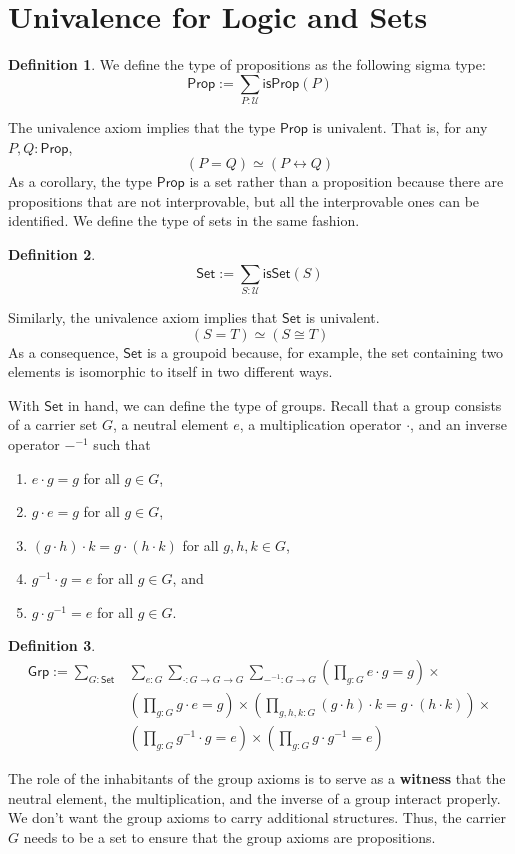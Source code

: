 \documentclass{amsart}
\theoremstyle{definition}
\newtheorem{defn}{Definition}[section]
\newcommand{\Prop}{\ensuremath{\mathsf{Prop}}}
\newcommand{\isProp}{\ensuremath{\mathsf{isProp}}}
\newcommand{\Set}{\ensuremath{\mathsf{Set}}}
\newcommand{\isSet}{\ensuremath{\mathsf{isSet}}}
\newcommand{\Grp}{\ensuremath{\mathsf{Grp}}}
\newcommand{\U}{\ensuremath{\mathcal{U}}}
\renewcommand{\emph}{\textbf}
\begin{document}
\section{Univalence for Logic and Sets}
\begin{defn}
    We define the type of propositions as the following sigma type:
    \[\Prop := \sum_{P : \U} \isProp(P)\]
\end{defn}
The univalence axiom implies that the type $\Prop$ is univalent.
That is, for any $P, Q : \Prop$,
\[
    (P = Q) \simeq (P \leftrightarrow Q)
\]
As a corollary, the type $\Prop$ is a set rather than a proposition because there are propositions that are not interprovable, but all the interprovable ones can be identified.
We define the type of sets in the same fashion.
\begin{defn}
\[
    \Set := \sum_{S : \U} \isSet(S)
\]
\end{defn}
Similarly, the univalence axiom implies that $\Set$ is univalent.
\[
    (S = T) \simeq (S \cong T)
\]
As a consequence, $\Set$ is a groupoid because, for example, the set containing two elements is isomorphic to itself in two different ways.

With $\Set$ in hand, we can define the type of groups.
Recall that a group consists of a carrier set $G$, a neutral element $e$, a multiplication operator $\cdot$, and an inverse operator $-^{-1}$ such that
\begin{enumerate}
    \item $e \cdot g = g$ for all $g \in G$,
    \item $g \cdot e = g$ for all $g \in G$,
    \item $(g \cdot h) \cdot k = g \cdot (h \cdot k)$ for all $g, h, k \in G$,
    \item $g^{-1} \cdot g = e$ for all $g \in G$, and
    \item $g \cdot g^{-1} = e$ for all $g \in G$.
\end{enumerate}
\begin{defn}
    \begin{align*}
        \Grp := \sum_{G : \Set}&\sum_{e : G}\sum_{\cdot : G \to G \to G}\sum_{-^{-1} : G \to G}\left(\prod_{g : G} e \cdot g = g\right) \times\\
        &\left(\prod_{g : G} g \cdot e = g\right) \times \left(\prod_{g,h,k : G}(g \cdot h) \cdot k = g \cdot (h \cdot k)\right) \times\\
        &\left(\prod_{g : G}g^{-1} \cdot g = e\right) \times \left(\prod_{g : G}g \cdot g^{-1} = e\right)
    \end{align*}
\end{defn}
The role of the inhabitants of the group axioms is to serve as a \emph{witness} that the neutral element, the multiplication, and the inverse of a group interact properly.
We don't want the group axioms to carry additional structures.
Thus, the carrier $G$ needs to be a set to ensure that the group axioms are propositions.
\end{document}
